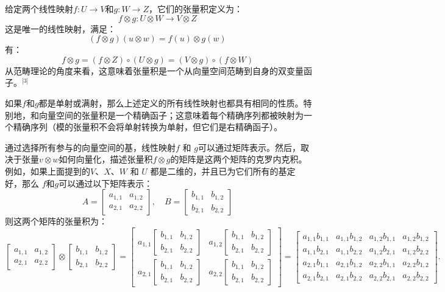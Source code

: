 给定两个线性映射\( f: U \to V \)和\( g: W \to Z \)，它们的张量积定义为：
\[
f \otimes g: U \otimes W \to V \otimes Z~
\]
这是唯一的线性映射，满足：
\[
(f \otimes g)(u \otimes w) = f(u) \otimes g(w)~
\]
有：
\[
f \otimes g = (f \otimes Z) \circ (U \otimes g) = (V \otimes g) \circ (f \otimes W)~
\]
从范畴理论的角度来看，这意味着张量积是一个从向量空间范畴到自身的双变量函子。\(^\text{[3]}\)

如果\( f \)和\( g \)都是单射或满射，那么上述定义的所有线性映射也都具有相同的性质。特别地，和向量空间的张量积是一个精确函子；这意味着每个精确序列都被映射为一个精确序列（模的张量积不会将单射转换为单射，但它们是右精确函子）。

通过选择所有参与的向量空间的基，线性映射\( f \) 和 \( g \)可以通过矩阵表示。然后，取决于张量\( v \otimes w \)如何向量化，描述张量积\( f \otimes g \)的矩阵是这两个矩阵的克罗内克积。例如，如果上面提到的\( V \)、\( X \)、\( W \) 和 \( U \) 都是二维的，并且已为它们所有的基定好，那么 \( f \)和\( g \)可以通过以下矩阵表示：
\[
A = \begin{bmatrix} a_{1,1} & a_{1,2} \\ a_{2,1} & a_{2,2} \end{bmatrix}, \quad B = \begin{bmatrix} b_{1,1} & b_{1,2} \\ b_{2,1} & b_{2,2} \end{bmatrix}~
\]
则这两个矩阵的张量积为：
\[
\begin{bmatrix}
a_{1,1} & a_{1,2} \\
a_{2,1} & a_{2,2}
\end{bmatrix}
\otimes
\begin{bmatrix}
b_{1,1} & b_{1,2} \\
b_{2,1} & b_{2,2}
\end{bmatrix}
=
\begin{bmatrix}
a_{1,1}\begin{bmatrix}b_{1,1} & b_{1,2} \\ b_{2,1} & b_{2,2}\end{bmatrix} & a_{1,2}\begin{bmatrix}b_{1,1} & b_{1,2} \\ b_{2,1} & b_{2,2}\end{bmatrix} \\
a_{2,1}\begin{bmatrix}b_{1,1} & b_{1,2} \\ b_{2,1} & b_{2,2}\end{bmatrix} & a_{2,2}\begin{bmatrix}b_{1,1} & b_{1,2} \\ b_{2,1} & b_{2,2}\end{bmatrix}
\end{bmatrix}
=
\begin{bmatrix}
a_{1,1}b_{1,1} & a_{1,1}b_{1,2} & a_{1,2}b_{1,1} & a_{1,2}b_{1,2} \\
a_{1,1}b_{2,1} & a_{1,1}b_{2,2} & a_{1,2}b_{2,1} & a_{1,2}b_{2,2} \\
a_{2,1}b_{1,1} & a_{2,1}b_{1,2} & a_{2,2}b_{1,1} & a_{2,2}b_{1,2} \\
a_{2,1}b_{2,1} & a_{2,1}b_{2,2} & a_{2,2}b_{2,1} & a_{2,2}b_{2,2}
\end{bmatrix}.~
\]

